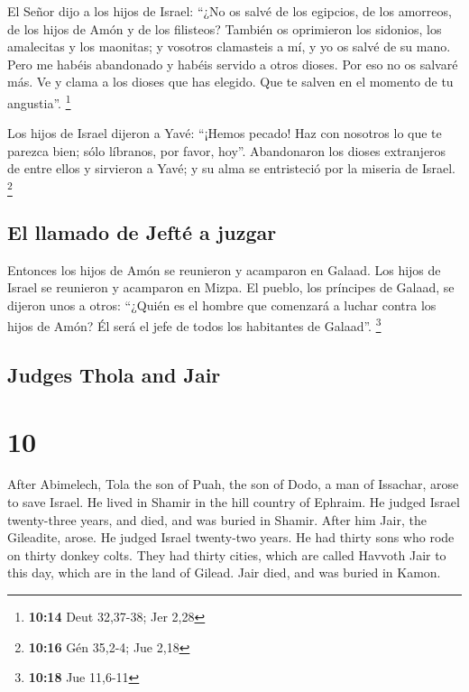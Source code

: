 \begin{paracol}{2}
 El Señor dijo a los hijos de Israel: ``¿No os salvé de
los egipcios, de los amorreos, de los hijos de Amón y de los filisteos?
 También os oprimieron los sidonios, los amalecitas y los
maonitas; y vosotros clamasteis a mí, y yo os salvé de su mano.
 Pero me habéis abandonado y habéis servido a otros
dioses. Por eso no os salvaré más.  Ve y clama a los
dioses que has elegido. Que te salven en el momento de tu angustia''.
\footnote{\textbf{10:14} Deut 32,37-38; Jer 2,28}

 Los hijos de Israel dijeron a Yavé: ``¡Hemos pecado! Haz
con nosotros lo que te parezca bien; sólo líbranos, por favor, hoy''.
 Abandonaron los dioses extranjeros de entre ellos y
sirvieron a Yavé; y su alma se entristeció por la miseria de Israel.
\footnote{\textbf{10:16} Gén 35,2-4; Jue 2,18}

\hypertarget{el-llamado-de-jeftuxe9-a-juzgar}{%
\subsection{El llamado de Jefté a
juzgar}\label{el-llamado-de-jeftuxe9-a-juzgar}}

 Entonces los hijos de Amón se reunieron y acamparon en
Galaad. Los hijos de Israel se reunieron y acamparon en Mizpa.
 El pueblo, los príncipes de Galaad, se dijeron unos a
otros: ``¿Quién es el hombre que comenzará a luchar contra los hijos de
Amón? Él será el jefe de todos los habitantes de Galaad''. \footnote{\textbf{10:18}
  Jue 11,6-11}

\switchcolumn
\begin{otherlanguage}{english}

\hypertarget{judges-thola-and-jair}{%
\subsection{Judges Thola and Jair}\label{judges-thola-and-jair}}

\hypertarget{section-19}{%
\section{10}\label{section-19}}

 After Abimelech, Tola the son of Puah, the son of Dodo, a
man of Issachar, arose to save Israel. He lived in Shamir in the hill
country of Ephraim.  He judged Israel twenty-three years,
and died, and was buried in Shamir.  After him Jair, the
Gileadite, arose. He judged Israel twenty-two years.  He
had thirty sons who rode on thirty donkey colts. They had thirty cities,
which are called Havvoth Jair to this day, which are in the land of
Gilead.  Jair died, and was buried in Kamon.


\end{otherlanguage}
\end{paracol}
